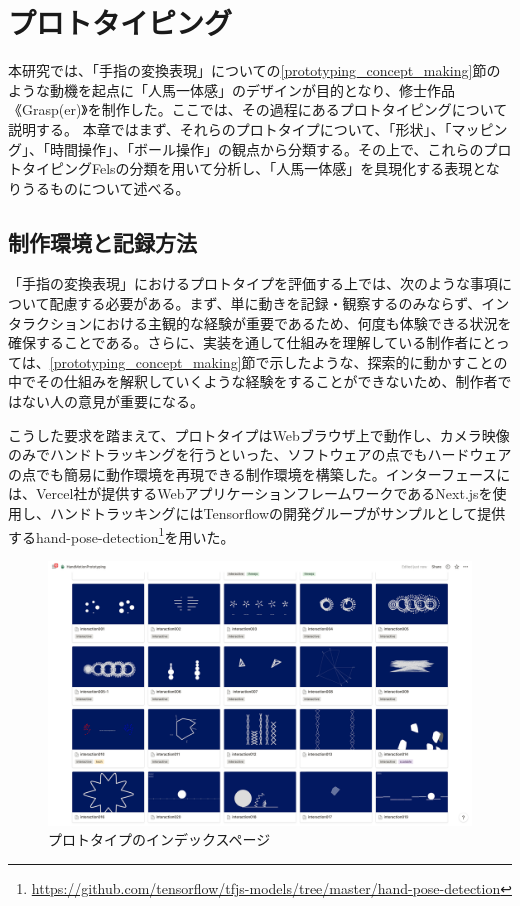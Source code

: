 \chapter{プロトタイピング}
\label{prototyping}
本研究では、「手指の変換表現」についての\ref{prototyping_concept_making}節のような動機を起点に「人馬一体感」のデザインが目的となり、修士作品《Grasp(er)》を制作した。ここでは、その過程にあるプロトタイピングについて説明する。
本章ではまず、それらのプロトタイプについて、「形状」、「マッピング」、「時間操作」、「ボール操作」の観点から分類する。その上で、これらのプロトタイピングFelsの分類を用いて分析し、「人馬一体感」を具現化する表現となりうるものについて述べる。

\section{制作環境と記録方法}
「手指の変換表現」におけるプロトタイプを評価する上では、次のような事項について配慮する必要がある。まず、単に動きを記録・観察するのみならず、インタラクションにおける主観的な経験が重要であるため、何度も体験できる状況を確保することである。さらに、実装を通して仕組みを理解している制作者にとっては、\ref{prototyping_concept_making}節で示したような、探索的に動かすことの中でその仕組みを解釈していくような経験をすることができないため、制作者ではない人の意見が重要になる。

こうした要求を踏まえて、プロトタイプはWebブラウザ上で動作し、カメラ映像のみでハンドトラッキングを行うといった、ソフトウェアの点でもハードウェアの点でも簡易に動作環境を再現できる制作環境を構築した。インターフェースには、Vercel社が提供するWebアプリケーションフレームワークであるNext.jsを使用し、ハンドトラッキングにはTensorflowの開発グループがサンプルとして提供するhand-pose-detection\footnote{\url{https://github.com/tensorflow/tfjs-models/tree/master/hand-pose-detection}}を用いた。

\begin{figure}[H]
  \centering
  \includegraphics[width=15cm]{img/prototype_overview.png}
  \caption{プロトタイプのインデックスページ}
  \label{fig:prototype_overview}
\end{figure}

